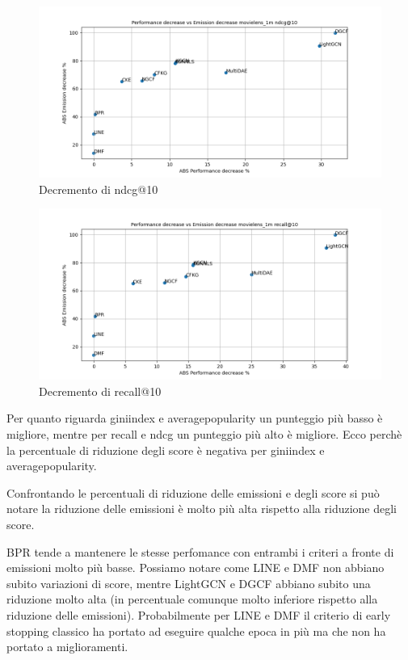 \begin{figure}[H]
    \centering
    \includegraphics[scale=0.5]{images/decrement_ndcg@10_movielens_1m.png}
    \caption{Decremento di ndcg@10}
\end{figure}

\begin{figure}[H]
    \centering
    \includegraphics[scale=0.5]{images/decrement_recall@10_movielens_1m.png}
    \caption{Decremento di recall@10}
\end{figure}


\noindent Per quanto riguarda giniindex e averagepopularity un punteggio più basso è migliore, mentre per recall e ndcg un punteggio più alto è migliore.
Ecco perchè la percentuale di riduzione degli score è negativa per giniindex e averagepopularity.

\noindent Confrontando le percentuali di riduzione delle emissioni e degli score si può notare la riduzione delle emissioni è molto più alta rispetto alla riduzione degli score.

\noindent BPR tende a mantenere le stesse perfomance con entrambi i criteri a fronte di emissioni molto più basse.
Possiamo notare come LINE e DMF non abbiano subito variazioni di score, mentre LightGCN e DGCF abbiano subito una riduzione molto alta (in percentuale comunque molto inferiore rispetto alla riduzione delle emissioni).
Probabilmente per LINE e DMF il criterio di early stopping classico ha portato ad eseguire qualche epoca in più ma che non ha portato a miglioramenti.

